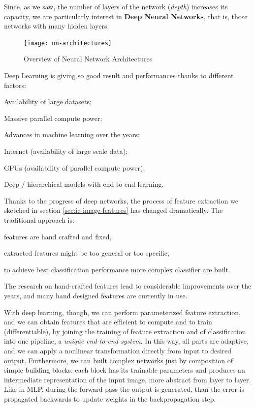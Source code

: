 Since, as we saw, the number of layers of the network (\textit{depth}) increases its capacity, we are particularly interest in \textbf{Deep Neural Networks}, that is, those networks with many hidden layers.

\begin{figure}[h!]
    \centering
    \texttt{[image: nn-architectures]}
    \caption[Overview of Neural Network Architectures]{Overview of Neural Network Architectures}
    \label{fig:dl-architectures}
\end{figure}

Deep Learning is giving so good result and performances thanks to different factors:
\begin{myitem}
    \item Availability of large datasets;
    \item Massive parallel compute power;
    \item Advances in machine learning over the years;
    \item Internet (availability of large scale data);
    \item GPUs (availability of parallel compute power);
    \item Deep / hierarchical models with end to end learning.
\end{myitem}

Thanks to the progress of deep networks, the process of feature extraction we sketched in section \ref{sec:ic-image-features} has changed dramatically. The traditional approach is:
\begin{myitem}
    \item features are hand crafted and fixed,
    \item extracted features might be too general or too specific,
    \item to achieve best classification performance more complex classifier are built.
\end{myitem}
The research on hand-crafted features lead to considerable improvements over the years, and many hand designed features are currently in use.

With deep learning, though, we can perform parameterized feature extraction, and we can obtain features that are efficient to compute and to train (differentiable), by joining the training of feature extraction and of classification into one pipeline, a \textit{unique end-to-end system}. In this way, all parts are adaptive, and we can apply a nonlinear transformation directly from input to desired output. Furthermore, we can built complex networks just by composition of simple building blocks: each block has its trainable parameters and produces an intermediate representation of the input image, more abstract from layer to layer. Like in MLP, during the forward pass the output is generated, than the error is propagated backwards to update weights in the backpropagation step.


